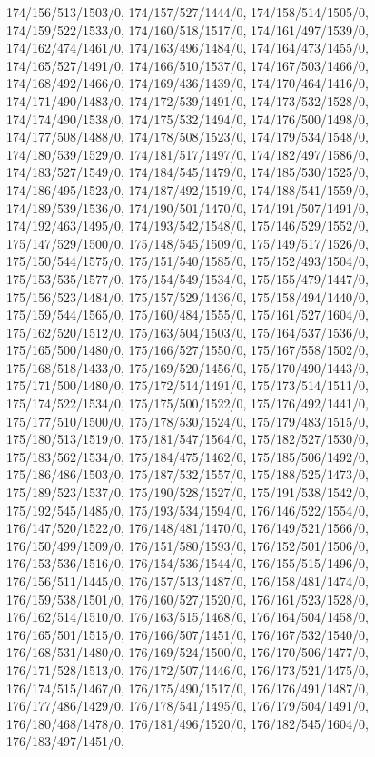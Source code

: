 {174/156/513/1503/0,%
174/157/527/1444/0,%
174/158/514/1505/0,%
174/159/522/1533/0,%
174/160/518/1517/0,%
174/161/497/1539/0,%
174/162/474/1461/0,%
174/163/496/1484/0,%
174/164/473/1455/0,%
174/165/527/1491/0,%
174/166/510/1537/0,%
174/167/503/1466/0,%
174/168/492/1466/0,%
174/169/436/1439/0,%
174/170/464/1416/0,%
174/171/490/1483/0,%
174/172/539/1491/0,%
174/173/532/1528/0,%
174/174/490/1538/0,%
174/175/532/1494/0,%
174/176/500/1498/0,%
174/177/508/1488/0,%
174/178/508/1523/0,%
174/179/534/1548/0,%
174/180/539/1529/0,%
174/181/517/1497/0,%
174/182/497/1586/0,%
174/183/527/1549/0,%
174/184/545/1479/0,%
174/185/530/1525/0,%
174/186/495/1523/0,%
174/187/492/1519/0,%
174/188/541/1559/0,%
174/189/539/1536/0,%
174/190/501/1470/0,%
174/191/507/1491/0,%
174/192/463/1495/0,%
174/193/542/1548/0,%
175/146/529/1552/0,%
175/147/529/1500/0,%
175/148/545/1509/0,%
175/149/517/1526/0,%
175/150/544/1575/0,%
175/151/540/1585/0,%
175/152/493/1504/0,%
175/153/535/1577/0,%
175/154/549/1534/0,%
175/155/479/1447/0,%
175/156/523/1484/0,%
175/157/529/1436/0,%
175/158/494/1440/0,%
175/159/544/1565/0,%
175/160/484/1555/0,%
175/161/527/1604/0,%
175/162/520/1512/0,%
175/163/504/1503/0,%
175/164/537/1536/0,%
175/165/500/1480/0,%
175/166/527/1550/0,%
175/167/558/1502/0,%
175/168/518/1433/0,%
175/169/520/1456/0,%
175/170/490/1443/0,%
175/171/500/1480/0,%
175/172/514/1491/0,%
175/173/514/1511/0,%
175/174/522/1534/0,%
175/175/500/1522/0,%
175/176/492/1441/0,%
175/177/510/1500/0,%
175/178/530/1524/0,%
175/179/483/1515/0,%
175/180/513/1519/0,%
175/181/547/1564/0,%
175/182/527/1530/0,%
175/183/562/1534/0,%
175/184/475/1462/0,%
175/185/506/1492/0,%
175/186/486/1503/0,%
175/187/532/1557/0,%
175/188/525/1473/0,%
175/189/523/1537/0,%
175/190/528/1527/0,%
175/191/538/1542/0,%
175/192/545/1485/0,%
175/193/534/1594/0,%
176/146/522/1554/0,%
176/147/520/1522/0,%
176/148/481/1470/0,%
176/149/521/1566/0,%
176/150/499/1509/0,%
176/151/580/1593/0,%
176/152/501/1506/0,%
176/153/536/1516/0,%
176/154/536/1544/0,%
176/155/515/1496/0,%
176/156/511/1445/0,%
176/157/513/1487/0,%
176/158/481/1474/0,%
176/159/538/1501/0,%
176/160/527/1520/0,%
176/161/523/1528/0,%
176/162/514/1510/0,%
176/163/515/1468/0,%
176/164/504/1458/0,%
176/165/501/1515/0,%
176/166/507/1451/0,%
176/167/532/1540/0,%
176/168/531/1480/0,%
176/169/524/1500/0,%
176/170/506/1477/0,%
176/171/528/1513/0,%
176/172/507/1446/0,%
176/173/521/1475/0,%
176/174/515/1467/0,%
176/175/490/1517/0,%
176/176/491/1487/0,%
176/177/486/1429/0,%
176/178/541/1495/0,%
176/179/504/1491/0,%
176/180/468/1478/0,%
176/181/496/1520/0,%
176/182/545/1604/0,%
176/183/497/1451/0,%
}

